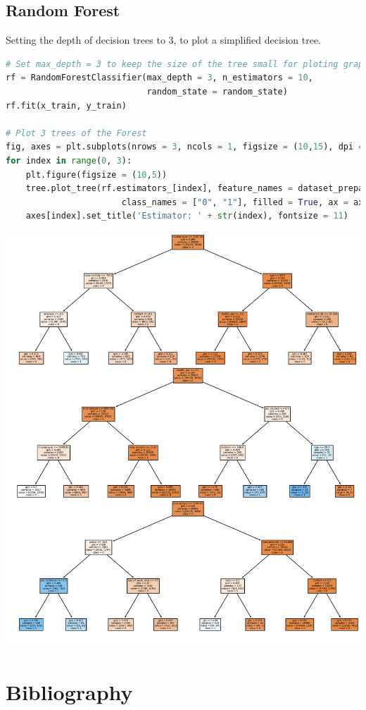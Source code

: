 \documentclass[11pt,a4paper]{article}
\begin{document}
    \subsection{Random Forest} \label{random_forest}
    Setting the depth of decision trees to 3, to plot a simplified decision tree.
\begin{lstlisting}[language = Python]
# Set max_depth = 3 to keep the size of the tree small for ploting graph
rf = RandomForestClassifier(max_depth = 3, n_estimators = 10,
                            random_state = random_state)
rf.fit(x_train, y_train)

# Plot 3 trees of the Forest
fig, axes = plt.subplots(nrows = 3, ncols = 1, figsize = (10,15), dpi = 100)
for index in range(0, 3):
    plt.figure(figsize = (10,5))
    tree.plot_tree(rf.estimators_[index], feature_names = dataset_prepared.columns,
                       class_names = ["0", "1"], filled = True, ax = axes[index])
    axes[index].set_title('Estimator: ' + str(index), fontsize = 11)
\end{lstlisting}
    \begin{center}
        \includegraphics[width = .9 \textwidth]{plot/classification/random_forest.pdf}
    \end{center}
    
    
    \newpage
    \section{Bibliography}
\end{document}
